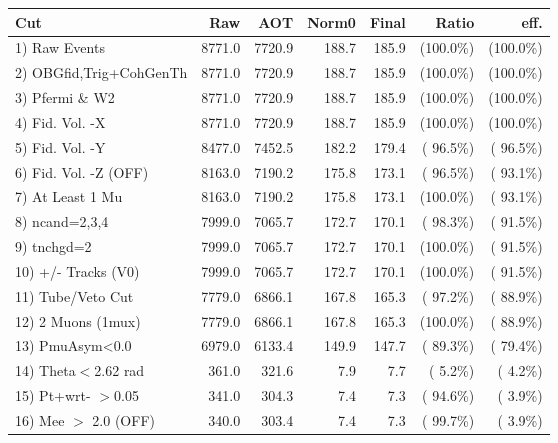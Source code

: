  \begin{table}[h!]\centering
 \begin{tabular}{||l||r|r|r|r|r|r||}
 \hline
 \hline
 Cut & Raw & AOT & Norm0 & Final & Ratio & eff.       \\
 \hline
  1) Raw Events           &       8771.0 &       7720.9 &        188.7 &        185.9 & (100.0\%) & (100.0\%) \\
  2) OBGfid,Trig+CohGenTh &       8771.0 &       7720.9 &        188.7 &        185.9 & (100.0\%) & (100.0\%) \\
  3) Pfermi \& W2         &       8771.0 &       7720.9 &        188.7 &        185.9 & (100.0\%) & (100.0\%) \\
  4) Fid. Vol. -X         &       8771.0 &       7720.9 &        188.7 &        185.9 & (100.0\%) & (100.0\%) \\
  5) Fid. Vol. -Y         &       8477.0 &       7452.5 &        182.2 &        179.4 & ( 96.5\%) & ( 96.5\%) \\
  6) Fid. Vol. -Z (OFF)   &       8163.0 &       7190.2 &        175.8 &        173.1 & ( 96.5\%) & ( 93.1\%) \\
  7) At Least 1 Mu        &       8163.0 &       7190.2 &        175.8 &        173.1 & (100.0\%) & ( 93.1\%) \\
  8) ncand=2,3,4          &       7999.0 &       7065.7 &        172.7 &        170.1 & ( 98.3\%) & ( 91.5\%) \\
  9) tnchgd=2             &       7999.0 &       7065.7 &        172.7 &        170.1 & (100.0\%) & ( 91.5\%) \\
 10) +/- Tracks (V0)      &       7999.0 &       7065.7 &        172.7 &        170.1 & (100.0\%) & ( 91.5\%) \\
 11) Tube/Veto Cut        &       7779.0 &       6866.1 &        167.8 &        165.3 & ( 97.2\%) & ( 88.9\%) \\
 12) 2 Muons (1mux)       &       7779.0 &       6866.1 &        167.8 &        165.3 & (100.0\%) & ( 88.9\%) \\
 13) PmuAsym<0.0          &       6979.0 &       6133.4 &        149.9 &        147.7 & ( 89.3\%) & ( 79.4\%) \\
 14) Theta$<$2.62 rad     &        361.0 &        321.6 &          7.9 &          7.7 & (  5.2\%) & (  4.2\%) \\
 15) Pt+wrt- $>$0.05      &        341.0 &        304.3 &          7.4 &          7.3 & ( 94.6\%) & (  3.9\%) \\
 16) Mee $>$ 2.0  (OFF)   &        340.0 &        303.4 &          7.4 &          7.3 & ( 99.7\%) & (  3.9\%) \\

\end{tabular}
\end{table}
